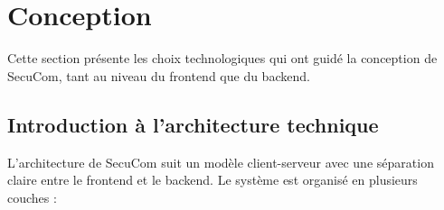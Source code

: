 \documentclass[12pt,a4paper]{report}
\begin{document}



\chapter{Conception}

Cette section présente les choix technologiques qui ont guidé la conception de SecuCom, tant au niveau du frontend que du backend.

\section{Introduction à l'architecture technique}

L'architecture de SecuCom suit un modèle client-serveur avec une séparation claire entre le frontend et le backend. Le système est organisé en plusieurs couches :
\end{document}
